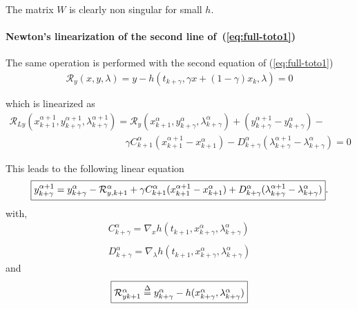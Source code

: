 The matrix $W$ is clearly non singular for small $h$.


 \paragraph{Newton's linearization of the second  line of~(\ref{eq:full-toto1})}
The same operation is performed with the second equation of (\ref{eq:full-toto1})
\begin{equation}
  \begin{array}{l}
    \mathcal R_y(x,y,\lambda)=y-h(t_{k+\gamma},\gamma x + (1-\gamma) x_k ,\lambda) =0\\ \\
  \end{array}
\end{equation}
which is linearized as
\begin{equation}
  \label{eq:full-NL9}
  \begin{array}{l}
    \mathcal R_{Ly}(x^{\alpha+1}_{k+1},y^{\alpha+1}_{k+\gamma},\lambda^{\alpha+1}_{k+\gamma}) = \mathcal
    R_{y}(x^{\alpha}_{k+1},y^{\alpha}_{k+\gamma},\lambda^{\alpha}_{k+\gamma}) +
    (y^{\alpha+1}_{k+\gamma}-y^{\alpha}_{k+\gamma})- \\[2mm] \qquad  \qquad \qquad \qquad  \qquad \qquad
    \gamma C^{\alpha}_{k+1}(x^{\alpha+1}_{k+1}-x^{\alpha}_{k+1}) - D^{\alpha}_{k+\gamma}(\lambda^{\alpha+1}_{k+\gamma}-\lambda^{\alpha}_{k+\gamma})=0
  \end{array}
\end{equation}

This leads to the following linear equation
\begin{equation}
  \boxed{y^{\alpha+1}_{k+\gamma} =  y^{\alpha}_{k+\gamma}
  -\mathcal R^{\alpha}_{y,k+1}+ \\
  \gamma C^{\alpha}_{k+1}(x^{\alpha+1}_{k+1}-x^{\alpha}_{k+1}) +
  D^{\alpha}_{k+\gamma}(\lambda^{\alpha+1}_{k+\gamma}-\lambda^{\alpha}_{k+\gamma})}. \label{eq:full-NL11y}
\end{equation}
with,
\begin{equation}
     \begin{array}{l}
  C^{\alpha}_{k+\gamma} = \nabla_xh(t_{k+1}, x^{\alpha}_{k+\gamma},\lambda^{\alpha}_{k+\gamma} ) \\ \\
  D^{\alpha}_{k+\gamma} = \nabla_{\lambda}h(t_{k+1}, x^{\alpha}_{k+\gamma},\lambda^{\alpha}_{k+\gamma})
 \end{array}
\end{equation}
and
\begin{equation}\fbox{$
\mathcal R^{\alpha}_{yk+1} \stackrel{\Delta}{=} y^{\alpha}_{k+\gamma} - h(x^{\alpha}_{k+\gamma},\lambda^{\alpha}_{k+\gamma})$}
 \end{equation}
